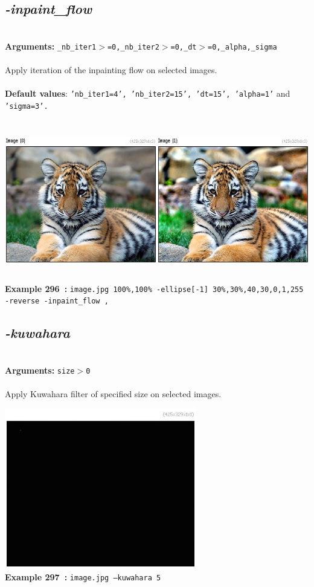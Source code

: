 \documentclass[a4paper,11pt,twoside]{book}
\begin{document}
\subsection{\emph{-inpaint\_flow} }\vspace*{-0.5em}
~\\\textbf{Arguments: } 
{\small \texttt{\_nb\_iter1$>$=0,\_nb\_iter2$>$=0,\_dt$>$=0,\_alpha,\_sigma}}\\~\\
Apply iteration of the inpainting flow on selected images.
~\\~\\\textbf{Default values}: {\small \texttt{'nb\_iter1=4', 'nb\_iter2=15', 'dt=15', 'alpha=1'} and \texttt{'sigma=3'.}}
\begin{center}\includegraphics[keepaspectratio=true,height=7cm,width=\textwidth]{img/gmic_def296.jpg}\\
{\footnotesize \textbf{Example 296~:} \texttt{image.jpg 100\%,100\% -ellipse[-1] 30\%,30\%,40,30,0,1,255 -reverse -inpaint\_flow ,}}
\end{center}

\subsection{\emph{-kuwahara} }\vspace*{-0.5em}
~\\\textbf{Arguments: } 
{\small \texttt{size$>$0}}\\~\\
Apply Kuwahara filter of specified size on selected images.
\begin{center}\includegraphics[keepaspectratio=true,height=7cm,width=\textwidth]{img/gmic_def297.jpg}\\
{\footnotesize \textbf{Example 297~:} \texttt{image.jpg --kuwahara 5}}
\end{center}
\end{document}
